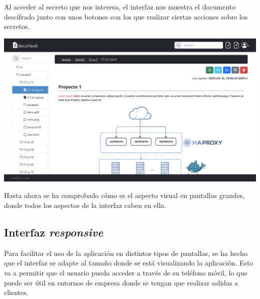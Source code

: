 \documentclass{\ClassPath/viu-tfm-template}
\begin{document}
Al acceder al secreto que nos interesa, el interfaz nos muestra el documento descifrado junto con unos botones con los que realizar ciertas acciones sobre los secretos.


\begin{center}
    \includegraphics[frame,width=\linewidth]{img/interfaz2.png}
\end{center}

Hasta ahora se ha comprobado cómo es el aspecto visual en pantallas grandes, donde todos los aspectos de la interfaz caben en ella.

\subsection{Interfaz \textit{responsive}}

Para facilitar el uso de la aplicación en distintos tipos de pantallas, se ha hecho que el interfaz se adapte al tamaño donde se está visualizando la aplicación. Esto va a permitir que el usuario pueda acceder a través de su teléfono móvil, lo que puede ser útil en entornos de empresa donde se tengan que realizar salidas a clientes.
\end{document}
